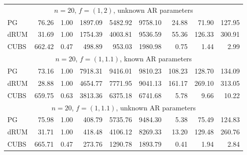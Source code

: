 \documentclass[12pt]{article}
\begin{document}
\begin{table}
\begin{center}
\begin{tabular}{l r r r r r r r r }
      \multicolumn{9}{c}{$n=20$, $f = (1,2)$, unknown AR parameters} \\
      PG   &    76.26 &     1.00 &   1897.09 &   5482.92 &   9758.10 &     24.88 &     71.90 &    127.95 \\
      dRUM   &    31.69 &     1.00 &   1754.39 &   4003.81 &   9536.59 &     55.36 &    126.33 &    300.91 \\
      CUBS   &   662.42 &     0.47 &    498.89 &    953.03 &   1980.98 &      0.75 &      1.44 &      2.99
      \\ %


      \multicolumn{9}{c}{$n=20$, $f = (1,1.1)$, known AR parameters} \\
      PG   &    73.16 &     1.00 &   7918.31 &   9416.01 &   9810.23 &    108.23 &    128.70 &    134.09 \\
      dRUM   &    28.88 &     1.00 &   4654.77 &   7771.95 &   9041.13 &    161.17 &    269.10 &    313.05 \\
      CUBS   &   659.75 &     0.63 &   3813.36 &   6375.18 &   6741.68 &      5.78 &      9.66 &     10.22
      \\ %

      \multicolumn{9}{c}{$n=20$, $f = (1,1.1)$, unknown AR parameters} \\
      PG   &    75.98 &     1.00 &    408.79 &   5735.76 &   9484.30 &      5.38 &     75.49 &    124.83 \\
      dRUM   &    31.71 &     1.00 &    418.48 &   4106.12 &   8269.33 &     13.20 &    129.48 &    260.76 \\
      CUBS   &   665.71 &     0.47 &    273.76 &   1290.78 &   1893.79 &      0.41 &      1.94 &      2.84
    \end{tabular}
  \end{center}


\end{table}
\end{document}
